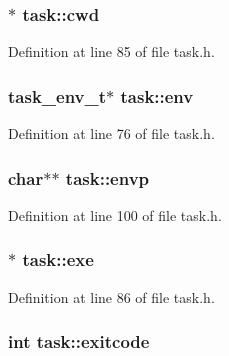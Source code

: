 \hypertarget{structtask_a7099e7ba6a4c94559edfb4d396803b15}{
\subsubsection[{cwd}]{$\ast$ task\+::cwd}}\label{structtask_a7099e7ba6a4c94559edfb4d396803b15}


Definition at line 85 of file task.\+h.

\hypertarget{structtask_a8dbbb79f7c29771d36f1d98ec84cbbdf}{
\subsubsection[{env}]{\setlength{\rightskip}{0pt plus 5cm}task\+\_\+env\+\_\+t$\ast$ task\+::env}}\label{structtask_a8dbbb79f7c29771d36f1d98ec84cbbdf}


Definition at line 76 of file task.\+h.

\hypertarget{structtask_a09fbc78d666a0b49e2e2064121d28364}{
\subsubsection[{envp}]{\setlength{\rightskip}{0pt plus 5cm}char$\ast$$\ast$ task\+::envp}}\label{structtask_a09fbc78d666a0b49e2e2064121d28364}


Definition at line 100 of file task.\+h.

\hypertarget{structtask_a22a59fcfc18d5f671340669f96571768}{
\subsubsection[{exe}]{$\ast$ task\+::exe}}\label{structtask_a22a59fcfc18d5f671340669f96571768}


Definition at line 86 of file task.\+h.

\hypertarget{structtask_a9bd7bbd83fe1f4744c76ff240b6da5db}{
\subsubsection[{exitcode}]{\setlength{\rightskip}{0pt plus 5cm}int task\+::exitcode}}\label{structtask_a9bd7bbd83fe1f4744c76ff240b6da5db}


